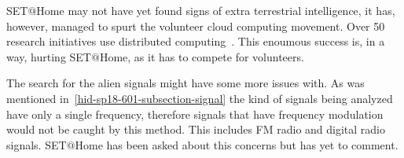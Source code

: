 SET$@$Home may not have yet found signs of extra terrestrial intelligence, it 
has, however, managed to spurt the volunteer cloud computing movement. Over 50
research initiatives use distributed 
computing~\cite{hid-sp18-601-www-boinc-projects}. This enoumous success is, in a 
way, hurting SET$@$Home, as it has to compete for volunteers. 


The search for the alien signals might have some more issues with. As was 
mentioned in~\ref{hid-sp18-601-subsection-signal} the kind of signals being 
analyzed have only a single frequency, therefore signals that have frequency 
modulation would not be caught by this method. This includes FM radio and 
digital radio signals. SET$@$Home has been asked about this concerns but has 
yet to comment.





 

